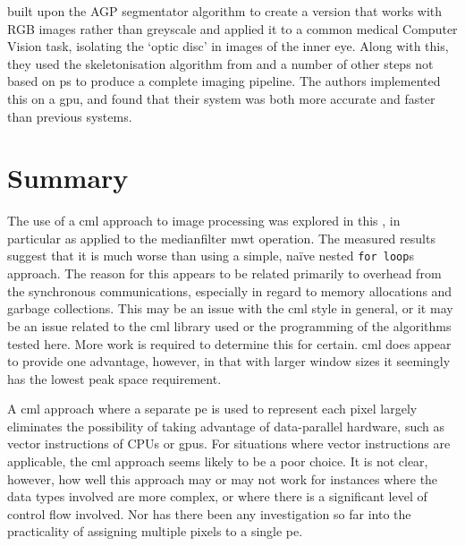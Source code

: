 \citeauthor{Diaz-Pernil2016} \cite{Diaz-Pernil2016} built upon the AGP segmentator algorithm to create a version that works with RGB images rather than greyscale and applied it to a common medical Computer Vision task, isolating the `optic disc' in images of the inner eye.  Along with this, they used the skeletonisation algorithm from \cite{Diaz-Pernil2013a} and a number of other steps not based on \gls{ps} to produce a complete imaging pipeline.  The authors implemented this on a \gls{gpu}, and found that their system was both more accurate and faster than previous systems.





\section{Summary}
The use of a \gls{cml} approach to image processing was explored in this , in particular as applied to the \gls{medianfilter} \gls{mwt} operation.  The measured results suggest that it is much worse than using a simple, naïve nested \texttt{for loop}s approach.  The reason for this appears to be related primarily to overhead from the synchronous communications, especially in regard to memory allocations and garbage collections.  This may be an issue with the \gls{cml} style in general, or it may be an issue related to the \gls{cml} library used or the programming of the algorithms tested here.  More work is required to determine this for certain.  \Gls{cml} does appear to provide one advantage, however, in that with larger window sizes it seemingly has the lowest peak space requirement.

A \gls{cml} approach where a separate \gls{pe} is used to represent each pixel largely eliminates the possibility of taking advantage of data-parallel hardware, such as vector instructions of CPUs or \glspl{gpu}.  For situations where vector instructions are applicable, the \gls{cml} approach seems likely to be a poor choice.  It is not clear, however, how well this approach may or may not work for instances where the data types involved are more complex, or where there is a significant level of control flow involved.  Nor has there been any investigation so far into the practicality of assigning multiple pixels to a single \gls{pe}.